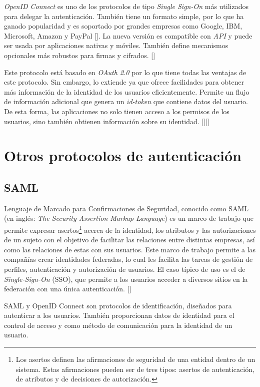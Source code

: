 \textit{OpenID Connect }es uno de los protocolos de tipo \textit{Single Sign-On} más utilizados para delegar la autenticación. También tiene un formato simple, por lo que ha ganado popularidad y es soportado por grandes empresas como Google, IBM, Microsoft, Amazon y PayPal [\cite{mainka2017sok}]. La nueva versión es compatible con \textit{API} y puede ser usada por aplicaciones nativas y móviles. También define mecanismos opcionales más robustos para firmas y cifrados. [\cite{openid-doc}]

Este protocolo está basado en \textit{OAuth 2.0} por lo que tiene todas las ventajas de este protocolo. Sin embargo, lo extiende ya que ofrece facilidades para obtener más información de la identidad de los usuarios eficientemente. Permite un flujo de información adicional que genera un \textit{id-token} que contiene datos del usuario. De esta forma, las aplicaciones no solo tienen acceso a los permisos de los usuarios, sino también obtienen información sobre su identidad.  [\cite{openid-doc}][\cite{kutera2016single}]

\section{Otros protocolos de autenticación}
\subsection{SAML}
Lenguaje de Marcado para Confirmaciones de Seguridad, conocido como SAML (en inglés: \textit{The Security Assertion Markup Language}) es un marco de trabajo que permite expresar asertos\footnote{ Los asertos definen las afirmaciones de seguridad de una entidad dentro de un sistema. Estas afirmaciones pueden ser de tres tipos: asertos de autenticación, de atributos y de decisiones de autorización.} acerca de la identidad, los atributos y las autorizaciones de un sujeto con el objetivo de facilitar las relaciones entre distintas empresas, así como las relaciones de estas con sus usuarios. Este marco de trabajo permite a las compañías crear identidades federadas, lo cual les facilita las tareas de gestión de perfiles, autenticación y autorización de usuarios. El caso típico de uso es el de \textit{Single-Sign-On }(SSO), que permite a los usuarios acceder a diversos sitios en la federación con una única autenticación. [\cite{sanchez2009estudio}]

SAML y OpenID Connect son protocolos de identificación, diseñados para autenticar a los usuarios. También proporcionan datos de identidad para el control de acceso y como método de comunicación para la identidad de un usuario.

